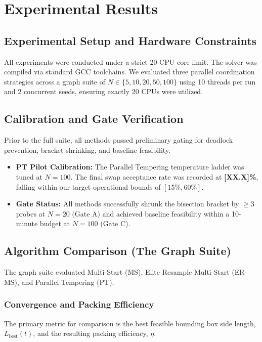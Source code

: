 \section{Experimental Results}

\subsection{Experimental Setup and Hardware Constraints}
All experiments were conducted under a strict 20 CPU core limit. The solver was compiled via standard GCC toolchains. We evaluated three parallel coordination strategies across a graph suite of $N \in \{5, 10, 20, 50, 100\}$ using 10 threads per run and 2 concurrent seeds, ensuring exactly 20 CPUs were utilized.

\subsection{Calibration and Gate Verification}
Prior to the full suite, all methods passed preliminary gating for deadlock prevention, bracket shrinking, and baseline feasibility.

\begin{itemize}
  \item \textbf{PT Pilot Calibration:} The Parallel Tempering temperature ladder was tuned at $N=100$. The final swap acceptance rate was recorded at \textbf{[XX.X]\%}, falling within our target operational bounds of $[15\%, 60\%]$.
  \item \textbf{Gate Status:} All methods successfully shrunk the bisection bracket by $\geq 3$ probes at $N=20$ (Gate A) and achieved baseline feasibility within a 10-minute budget at $N=100$ (Gate C).
\end{itemize}

\subsection{Algorithm Comparison (The Graph Suite)}
The graph suite evaluated Multi-Start (MS), Elite Resample Multi-Start (ER-MS), and Parallel Tempering (PT).

\subsubsection{Convergence and Packing Efficiency}
The primary metric for comparison is the best feasible bounding box side length, $L_{\text{best}}(t)$, and the resulting packing efficiency, $\eta$.

